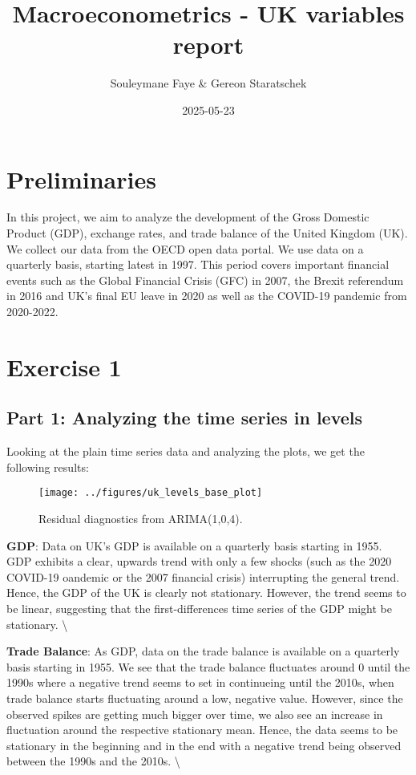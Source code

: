 \documentclass[
]{article}
\title{Macroeconometrics - UK variables report}
\author{Souleymane Faye \& Gereon Staratschek}
\date{2025-05-23}
\begin{document}
\maketitle

\section*{Preliminaries}

In this project, we aim to analyze the development of the Gross Domestic
Product (GDP), exchange rates, and trade balance of the United Kingdom
(UK). We collect our data from the OECD open data portal. We use data on
a quarterly basis, starting latest in 1997. This period covers important
financial events such as the Global Financial Crisis (GFC) in 2007, the
Brexit referendum in 2016 and UK's final EU leave in 2020 as well as the
COVID-19 pandemic from 2020-2022.

\section*{Exercise 1}

\subsection*{Part 1: Analyzing the time series in levels}

Looking at the plain time series data and analyzing the plots, we get
the following results:

\begin{figure}

{\centering \texttt{[image: ../figures/uk\_levels\_base\_plot]} 

}

\caption{Residual diagnostics from ARIMA(1,0,4).}\label{fig:resid-plot}
\end{figure}

\textbf{GDP}: Data on UK's GDP is available on a quarterly basis
starting in 1955. GDP exhibits a clear, upwards trend with only a few
shocks (such as the 2020 COVID-19 oandemic or the 2007 financial crisis)
interrupting the general trend. Hence, the GDP of the UK is clearly not
stationary. However, the trend seems to be linear, suggesting that the
first-differences time series of the GDP might be stationary.
\textbackslash{}

\textbf{Trade Balance}: As GDP, data on the trade balance is available
on a quarterly basis starting in 1955. We see that the trade balance
fluctuates around 0 until the 1990s where a negative trend seems to set
in continueing until the 2010s, when trade balance starts fluctuating
around a low, negative value. However, since the observed spikes are
getting much bigger over time, we also see an increase in fluctuation
around the respective stationary mean. Hence, the data seems to be
stationary in the beginning and in the end with a negative trend being
observed between the 1990s and the 2010s. \textbackslash{}
\end{document}
